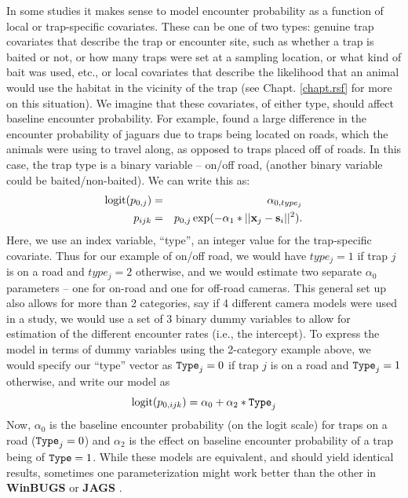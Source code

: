 In some studies it makes sense to model encounter probability as a
function of local or trap-specific covariates. These can be one of two
types: genuine trap covariates that describe the trap or encounter site,
such as whether a trap is baited or not, or how many traps were set at a sampling location,
or what kind of bait was used, etc., or local covariates that
describe the likelihood that an animal would use the habitat in the
vicinity of the trap (see Chapt. \ref{chapt.rsf} for more on this situation).
We imagine that these covariates, of either type, should affect
baseline encounter probability.
For example, \citet{sollmann_etal:2011}
found a large difference in the encounter probability of jaguars due to traps
being located on roads, which the animals were using to travel along, as
opposed to traps placed off of roads.  In this case, the trap
type is a binary variable -- on/off road,
(another binary variable could be baited/non-baited).  We can write
this 
as:
\begin{eqnarray*}
\mbox{logit}(p_{0,j}) &= &\alpha_{0,type_j}  \\
p_{ijk}  & = & p_{0,j} \exp(- \alpha_1*||{\bf x}_{j}-{\bf s}_{i}||^2).
\end{eqnarray*}
Here, we use an index variable, ``type'', an integer 
value for the trap-specific covariate. 
Thus for our example of on/off
road, we would have $type_j = 1$ if trap $j$ is on a road and $type_j =
2$ otherwise, and we would estimate two separate $\alpha_{0}$
parameters -- one for
on-road and one for off-road cameras.  This general set up also allows
for more than 2 categories, say if  4 different camera models were
used in a study, we would use a set of 3 binary dummy variables to
allow for
estimation of the different encounter rates (i.e., the intercept). 
To express the model in terms of dummy variables using 
the 2-category example above, we would
specify our ``type'' vector as $\mbox{\tt Type}_j = 0$ if trap $j$ is on a road and
$\mbox{\tt Type}_j = 1$ otherwise, and write our model as
\[
\mbox{logit}(p_{0,ijk}) = \alpha_{0} + \alpha_{2} * \mbox{\tt Type}_{j}
\]
Now, $\alpha_{0}$ is the baseline encounter probability (on the logit
scale) for traps on a road ($\mbox{\tt Type}_j = 0$) and $\alpha_{2}$ is the effect on
baseline encounter probability 
of a trap being of $\mbox{\tt Type} = 1$. While these models are
equivalent, and should
yield identical results, sometimes one parameterization might work
better than the other in {\bf WinBUGS} or {\bf JAGS}
\citep{kery:2010}.

